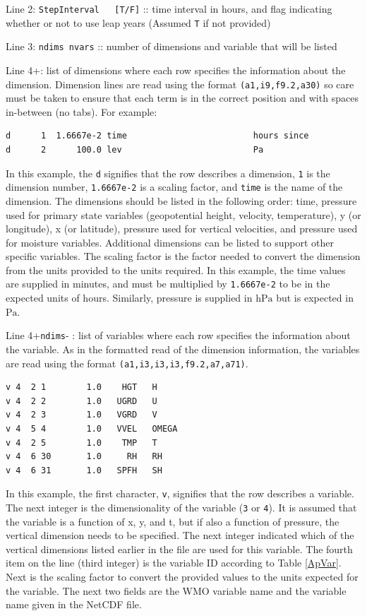 \documentclass[11pt]{article}   %
\begin{document}
Line 2: \verb|StepInterval   [T/F]| :: time interval in hours, and flag indicating
whether or not to use leap years (Assumed \verb|T| if not provided)

Line 3: \verb|ndims nvars| :: number of dimensions and variable that will be listed

Line 4+: list of dimensions where each row specifies the information about the dimension.
Dimension lines are read using the format \texttt{(a1,i9,f9.2,a30)} so care must be taken
to ensure that each term is in the correct position and with spaces in-between (no tabs).
For example:
\small
\begin{verbatim}
d      1  1.6667e-2 time                         hours since
d      2      100.0 lev                          Pa
\end{verbatim}
\normalsize
In this example, the \verb|d| signifies that the row describes a dimension, \verb|1| is
the dimension number, \verb|1.6667e-2| is a scaling factor, and
\verb|time| is the name of the dimension.  The dimensions should be listed in the
following order: time, pressure used for primary state variables (geopotential height, velocity,
temperature), y (or longitude), x (or latitude), pressure used for vertical velocities, and pressure
used for moisture variables.  Additional dimensions can be listed to support other
specific variables.  The scaling factor is the factor needed to convert the dimension
from the units provided to the units required.  In this example, the time values are
supplied in minutes, and must be multiplied by \verb|1.6667e-2| to be in the expected
units of hours.  Similarly, pressure is supplied in $\mathrm{hPa}$ but is expected in
$\mathrm{Pa}$.  

Line 4+\verb|ndims|- : list of variables where each row specifies the information about
the variable.
As in the formatted read of the dimension information, the variables are read using
the format \texttt{(a1,i3,i3,i3,f9.2,a7,a71)}.
\small
\begin{verbatim}
v 4  2 1        1.0    HGT   H
v 4  2 2        1.0   UGRD   U
v 4  2 3        1.0   VGRD   V
v 4  5 4        1.0   VVEL   OMEGA
v 4  2 5        1.0    TMP   T
v 4  6 30       1.0     RH   RH
v 4  6 31       1.0   SPFH   SH
\end{verbatim}
\normalsize
In this example, the first character, \verb|v|, signifies that the row describes a variable.
The next integer is the dimensionality of the variable (\verb|3| or \verb|4|).
It is assumed that the variable
is a function of x, y, and t, but if also a function of pressure, the vertical dimension
needs to be specified.  The next integer indicated which of the vertical dimensions listed
earlier in the file are used for this variable.  The fourth item on the line (third integer)
is the variable ID according to Table \ref{ApVar}.  Next is the scaling factor to convert
the provided values to the units expected for the variable.  The next two fields are the
WMO variable name and the variable name given in the NetCDF file.
\end{document}
